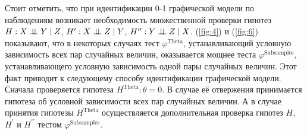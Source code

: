 Стоит отметить, что при идентификации 0-1 графической модели
по наблюдениям
возникает необходимость множественной проверки гипотез\\
$H: X \perp\!\!\!\perp Y \mid Z$, $H^{\prime}: X \perp\!\!\!\perp Z \mid Y$, 
$H^{\prime \prime}: Y \perp\!\!\!\perp Z \mid X$.
(\autoref{fig:4}) и (\autoref{fig:6}) показывают, что
в некоторых случаях тест $\varphi^{\text{Theta}}$, 
устанавливающий условную зависимость всех пар случайных величин,
оказывается мощнее теста $\varphi^{\text{Subsamples}}$, устанавливающего условную зависимость
одной пары случайных величин. 
Этот факт приводит к следующему способу идентификации графической
модели.
Сначала проверяется гипотеза
$H^{\text{Theta}}: \theta=0$. В случае её отвержения принимается
гипотеза об условной зависимости всех пар случайных величин. 
А в случае принятия гипотезы $H^{\text{Theta}}$ осуществляется 
дополнительная проверка гипотез $H$, $H^{\prime}$ и 
$H^{\prime \prime}$ тестом $\varphi^{\text{Subsamples}}$.









